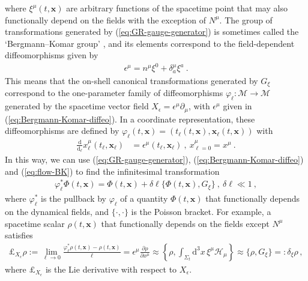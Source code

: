 \documentclass[12pt]{iopart}
\def\eq#1{\begin{equation}\begin{aligned}#1\end{aligned}\end{equation}}
\def\eref#1{(\ref{eq:#1})}
\def\D{\mathrm{d}}
\def\del#1#2{\frac{\partial#1}{\partial#2}}
\def\Del#1#2{\frac{\D#1}{\D#2}}
\def\x{\mathbf{x}}
\begin{document}
where $\xi^{\mu}(t,\x)$ are arbitrary functions of the spacetime point that may also functionally depend on the fields with the exception of $N^{\mu}$. The group of transformations generated by \eref{GR-gauge-generator} is sometimes called the `Bergmann--Komar group' \citep{Bergmann:1972ud,Pons:1996av,Pons:1999xu,Pons:2010ad}, and its elements correspond to the field-dependent diffeomorphisms given by
\eq{\label{eq:Bergmann-Komar-diffeo}
\epsilon^{\mu} = n^{\mu}\xi^0+\delta^{\mu}_a\xi^a \ .
}
This means that the on-shell canonical transformations generated by $G_{\xi}$ correspond to the one-parameter family of diffeomorphisms $\varphi_{\ell}:\mathcal{M}\to\mathcal{M}$ generated by the spacetime vector field $X_{\epsilon}=\epsilon^{\mu}\partial_{\mu}$, with $\epsilon^{\mu}$ given in \eref{Bergmann-Komar-diffeo}. In a coordinate representation, these diffeomorphisms are defined by $\varphi_{\ell}(t,\x) = (t_{\ell}(t,\x),\x_{\ell}(t,\x))$ with
\eq{\label{eq:flow-BK}
\Del{}{_{\ell}} x^{\mu}_{\ell}(t_{\ell},\x_{\ell}) & = \epsilon^{\mu}(t_{\ell},\x_{\ell}) \ , \ x^{\mu}_{\ell=0} = x^{\mu} \ .
}
In this way, we can use \eref{GR-gauge-generator}, \eref{Bergmann-Komar-diffeo} and \eref{flow-BK} to find the infinitesimal transformation
\eq{\label{eq:canonical-diffeo-inf}
\varphi_{\ell}^*\Phi(t,\x)=\Phi(t,\x)+\delta\ell\{\Phi(t,\x),G_{\xi}\} \ , \ \delta\ell\ll1 \ ,
}
where $\varphi_{\ell}^*$ is the pullback by $\varphi_{\ell}$ of a quantity $\Phi(t,\x)$ that functionally depends on the dynamical fields, and $\{\cdot,\cdot\}$ is the Poisson bracket. For example, a spacetime scalar $\rho(t,\x)$ that functionally depends on the fields except $N^{\mu}$ satisfies \citep{Pons:2010ad}
\eq{\label{eq:scalar-diffeo}
\pounds_{X_{\epsilon}}\rho:= \lim_{{\ell}\to0}\frac{\varphi_{\ell}^*\rho(t,\x)-\rho(t,\x)}{\ell} = \epsilon^{\mu}\del{\rho}{x^{\mu}} \approx \left\{\rho,\int_{\Sigma_t}\D^3x\,\xi^{\mu}\mathcal{H}_{\mu}\right\}\approx \{\rho,G_{\xi}\} =:\delta_{\xi}\rho \,,
}
where $\pounds_{X_{\epsilon}}$ is the Lie derivative with respect to $X_{\epsilon}$.
\end{document}
